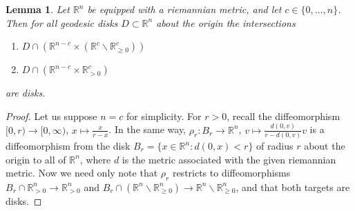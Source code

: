 \documentclass[11pt]{amsart}
\newcommand{\mbb}[1]{\mathbb{#1}}
\newcommand{\R}{\mbb{R}}
\numberwithin{equation}{section}
\theoremstyle{definition}
\theoremstyle{remark}
\theoremstyle{plain}
\newtheorem{lemma}[equation]{Lemma}
\begin{document}
\begin{lemma}\label{FBLD2TE}
    Let $\R^n$ be equipped with a riemannian metric, and let $c\in\{0,\dots,n\}$. Then for all geodesic disks $D\subset\R^n$ about the origin the intersections
    \begin{enumerate}
        \item $D\cap (\R^{n-c}\times(\R^{c}\smallsetminus\R^{c}_{\geq0}))$
        \item $D \cap (\R^{n-c}\times\R^{c}_{>0})$
    \end{enumerate}
    are disks.
\end{lemma}
\begin{proof}
    Let us suppose $n=c$ for simplicity. For $r>0$, recall the diffeomorphism $[0,r)\to[0,\infty)$, $x\mapsto\frac{x}{r-x}$. In the same way, $\rho_r\colon B_r\to\R^n$, $v\mapsto \frac{d(0,v)}{r-d(0,v)}v$ is a diffeomorphism from the disk $B_r=\{x\in\R^n : d(0,x)<r\}$ of radius $r$ about the origin to all of $\R^n$, where $d$ is the metric associated with the given riemannian metric. Now we need only note that $\rho_r$ restricts to diffeomorphisms $B_r\cap\R^n_{>0}\to\R^n_{>0}$ and $B_r\cap(\R^n\smallsetminus\R^n_{\geq0})\to\R^n\smallsetminus\R^n_{\geq0}$, and that both targets are disks.
\end{proof}
\end{document}
